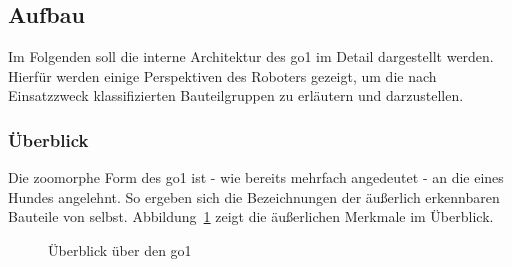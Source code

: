\subsection{Aufbau}
\label{subsec:aufbau}

Im Folgenden soll die interne Architektur des \gls{go1} im Detail dargestellt werden.
Hierfür werden einige Perspektiven des Roboters gezeigt, um die nach Einsatzzweck klassifizierten Bauteilgruppen zu erläutern und darzustellen.

\subsubsection{Überblick}

Die zoomorphe Form des \gls{go1} ist - wie bereits mehrfach angedeutet - an die eines Hundes angelehnt.
So ergeben sich die Bezeichnungen der äußerlich erkennbaren Bauteile von selbst.
Abbildung~\ref{fig:allgemeine_architektur} zeigt die äußerlichen Merkmale im Überblick.

\begin{figure}[h]
    \caption[Überblick über den Go1]{Überblick über den \gls{go1}}\label{fig:allgemeine_architektur}
\end{figure}

